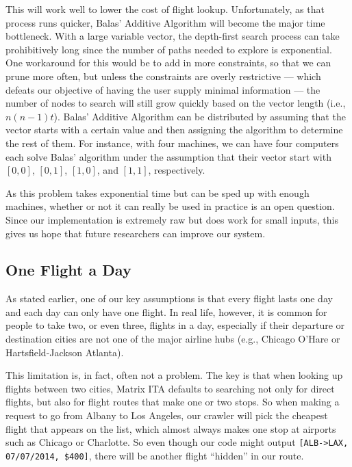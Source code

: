 \documentclass{article}
\begin{document}
This will work well to lower the cost of flight lookup. Unfortunately, as that process runs quicker, Balas' Additive Algorithm will become the major
time bottleneck. With a large variable vector, the depth-first search process can take prohibitively long since the number of paths needed to explore
is exponential. One workaround for this would be to add in more constraints, so that we can prune more often, but unless the constraints are overly
restrictive --- which defeats our objective of having the user supply minimal information --- the number of nodes to search will still grow quickly
based on the vector length (i.e., $n(n-1)t$). Balas' Additive Algorithm can be distributed by assuming that the vector starts with a certain value and
then assigning the algorithm to determine the rest of them. For instance, with four machines, we can have four computers each solve Balas' algorithm
under the assumption that their vector start with $[0,0]$, $[0,1]$, $[1,0]$, and $[1,1]$, respectively.

As this problem takes exponential time but can be sped up with enough machines, whether or not it can really be used in practice is an open question.
Since our implementation is extremely raw but does work for small inputs, this gives us hope that future researchers can improve our system.

\subsection{One Flight a Day}

As stated earlier, one of our key assumptions is that every flight lasts one day and each day can only have one flight. In real life, however, it is
common for people to take two, or even three, flights in a day, especially if their departure or destination cities are not one of the major airline
hubs (e.g., Chicago O'Hare or Hartsfield-Jackson Atlanta).

This limitation is, in fact, often not a problem. The key is that when looking up flights between two cities, Matrix ITA defaults to searching not
only for direct flights, but also for flight routes that make one or two stops. So when making a request to go from Albany to Los Angeles, our crawler
will pick the cheapest flight that appears on the list, which almost always makes one stop at airports such as Chicago or Charlotte. So even though
our code might output \texttt{[ALB->LAX, 07/07/2014, \$400]}, there will be another flight ``hidden'' in our route.
\end{document}
